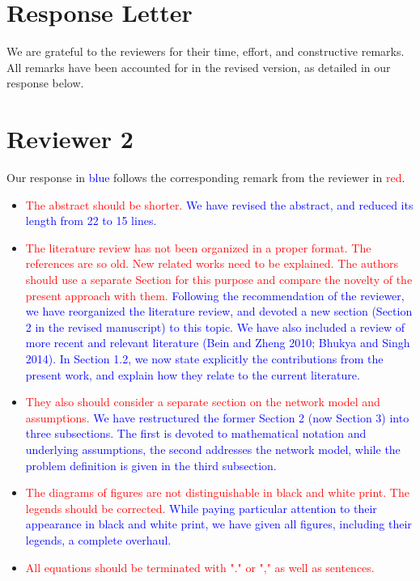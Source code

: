 \documentclass[12pt]{article}
\begin{document}
\section*{Response Letter}
We are grateful to the reviewers for their time, effort, and constructive remarks.
All remarks have been accounted for in the revised version, as detailed in our response below.

\section*{Reviewer 2}
Our response in \textcolor{blue}{blue} follows the corresponding remark from the reviewer in \textcolor{red}{red}.

\begin{itemize}
\item \textcolor{red}{The abstract should be shorter.} \textcolor{blue}{
We have revised the abstract, and reduced its length from 22 to 15 lines.
}
\item \textcolor{red}{The literature review has not been organized in a proper format. The references are so old. New related works need to be explained. The authors should use a separate Section for this purpose and compare the novelty of the present approach with them.} \textcolor{blue}{
Following the recommendation of the reviewer, we have reorganized the literature review, and devoted a new section (Section 2 in the revised manuscript)
to this topic. We have also included a review of more recent and relevant literature (Bein and Zheng 2010; Bhukya and Singh 2014).
In Section 1.2, we now state explicitly the contributions from the present work, and explain how they relate to the current literature.
}
\item \textcolor{red}{They also should consider a separate section on the network model and assumptions.} \textcolor{blue}{
We have restructured the former Section 2 (now Section 3) into three subsections.
The first is devoted to mathematical notation and underlying assumptions, the second addresses the network model,
while the problem definition is given in the third subsection.
}
\item \textcolor{red}{The diagrams of figures are not distinguishable in black and white print. The legends should be corrected.} \textcolor{blue}{
While paying particular attention to their appearance in black and white print, we have given all figures,
including their legends, a complete overhaul.
}
\item \textcolor{red}{All equations should be terminated with "." or "," as well as sentences.} \textcolor{blue}{
}
\end{itemize}
\end{document}
